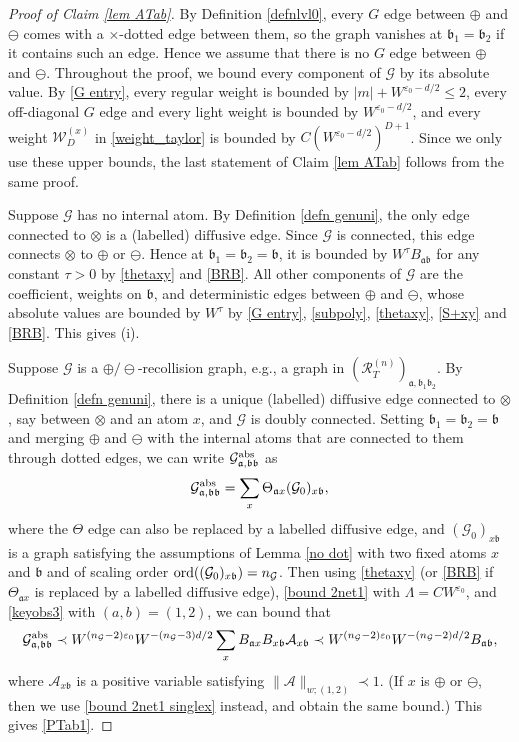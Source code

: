 \documentclass{article}
\newcommand{\1}{\mathds{1}}
\numberwithin{equation}{section}
\newcommand{\ord}{{\rm{ord}}}
\newcommand{\e}{{\varepsilon}}
\newcommand{\fa}{{\mathfrak a}}
\newcommand{\fb}{{\mathfrak b}}
\renewcommand{\cal}{\mathcal}
\renewcommand{\leq}{\leqslant}
\renewcommand{\le}{\leq}
\newcommand{\dashed}{\text{diffusive}}
\theoremstyle{plain} %
\theoremstyle{remark}
\newcommand{\PTn}{\mathcal R_T^{(n)}}
\begin{document}
\begin{proof}[Proof of Claim \ref{lem ATab}]
By Definition \ref{defnlvl0}, every $G$ edge between $\oplus$ and $\ominus$ comes with a $\times$-dotted edge between them, so the graph vanishes at $\fb_1=\fb_2$ if it contains such an edge. Hence we assume that there is no $G$ edge between $\oplus$ and $\ominus$. Throughout the proof, we bound every component of $\cal G$ by its absolute value. By \eqref{G entry}, every regular weight is bounded by $|m|+W^{\e_0-d/2}\le 2$, every off-diagonal $G$ edge and every light weight is bounded by $W^{\e_0-d/2}$, and every weight $\cal W^{(x)}_D$ in \eqref{weight_taylor} is bounded by $C(W^{\e_0-d/2})^{D+1}$. Since we only use these upper bounds, the last statement of Claim \ref{lem ATab} follows from the same proof.

\medskip
{} Suppose $\cal G$ has no internal atom. By Definition \ref{defn genuni}, the only edge connected to $\otimes$ is a (labelled) $\dashed$ edge. Since $\cal G$ is connected, this edge connects $\otimes$ to $\oplus$ or $\ominus$. Hence at $\fb_1=\fb_2=\fb$, it is bounded by $W^\tau B_{\fa\fb}$ for any constant $\tau>0$ by \eqref{thetaxy} and \eqref{BRB}. All other components of $\cal G$ are the coefficient, weights on $\fb$, and deterministic edges between $\oplus$ and $\ominus$, whose absolute values are bounded by $W^{\tau}$ by \eqref{G entry}, \eqref{subpoly}, \eqref{thetaxy}, \eqref{S+xy} and \eqref{BRB}. This gives (i).

\medskip
{} Suppose $\cal G$ is a $\oplus/\ominus$-recollision graph, e.g., a graph in $(\PTn)_{\fa,\fb_1\fb_2}$. By Definition \ref{defn genuni}, there is a unique (labelled) $\dashed$ edge connected to $\otimes$, say between $\otimes$ and an atom $x$, and $\cal G$ is doubly connected. Setting $\fb_1=\fb_2=\fb$ and merging $\oplus$ and $\ominus$ with the internal atoms that are connected to them through dotted edges, we can write $\cal G^{\rm abs}_{\fa,\fb\fb}$ as
$$\cal G^{\rm abs}_{\fa,\fb\fb}=\sum_x \Theta_{\fa x}(\cal G_0)_{x \fb},$$
where the $\Theta$ edge can also be replaced by a labelled $\dashed$ edge, and $(\cal G_0)_{x\fb}$ is a graph satisfying the assumptions of Lemma \ref{no dot} with two fixed atoms $x$ and $\fb$ and of scaling order $\ord((\cal G_0)_{x\fb})=n_{\cal G}$. Then using \eqref{thetaxy} (or \eqref{BRB} if $\Theta_{\fa x}$ is replaced by a labelled $\dashed$ edge), \eqref{bound 2net1} with $\Lambda=CW^{\e_0}$, and \eqref{keyobs3} with $(a,b)=(1,2)$, we can bound that
$$ \cal G^{\rm abs}_{\fa,\fb\fb}\prec W^{(n_{\cal G}-2)\e_0}W^{ -(n_{\cal G} - 3)d/2} \sum_{x} B_{\fa x}  B_{x\fb}\cal A_{x\fb} \prec W^{(n_{\cal G}-2)\e_0}W^{-(n_{\cal G} - 2)d/2}  B_{\fa  \fb} ,$$
where $\cal A_{x\fb}$ is a positive variable satisfying $\|\cal A\|_{w;(1,2)}\prec 1$. (If $x$ is $\oplus$ or $\ominus$, then we use \eqref{bound 2net1 singlex} instead, and obtain the same bound.) This gives \eqref{PTab1}.


\end{proof}
\end{document}
